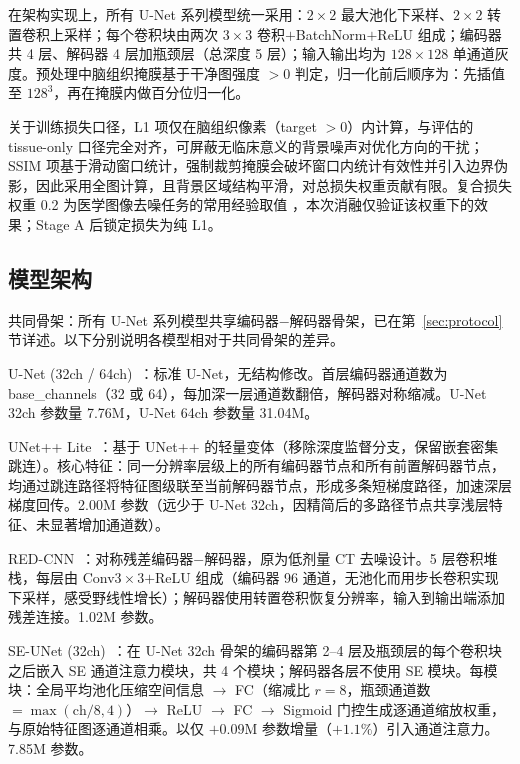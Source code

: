 \documentclass[UTF8,a4paper,12pt]{ctexart}
\begin{document}
在架构实现上，所有 U-Net 系列模型统一采用：$2\times2$ 最大池化下采样、$2\times2$ 转置卷积上采样；每个卷积块由两次 $3\times3$ 卷积$+$BatchNorm$+$ReLU 组成；编码器共 4 层、解码器 4 层加瓶颈层（总深度 5 层）；输入输出均为 $128\times128$ 单通道灰度。预处理中脑组织掩膜基于干净图强度 $>0$ 判定，归一化前后顺序为：先插值至 $128^3$，再在掩膜内做百分位归一化。

关于训练损失口径，L1 项仅在脑组织像素（target $> 0$）内计算，与评估的 tissue-only 口径完全对齐，可屏蔽无临床意义的背景噪声对优化方向的干扰；SSIM 项基于滑动窗口统计，强制裁剪掩膜会破坏窗口内统计有效性并引入边界伪影，因此采用全图计算，且背景区域结构平滑，对总损失权重贡献有限。复合损失权重 0.2 为医学图像去噪任务的常用经验取值 \cite{Ronneberger2015UNet,Zhang2017DnCNN}，本次消融仅验证该权重下的效果；Stage A 后锁定损失为纯 L1。

\subsection{模型架构}
\label{sec:architectures}

共同骨架：所有 U-Net 系列模型共享编码器$-$解码器骨架，已在第~\ref{sec:protocol} 节详述。以下分别说明各模型相对于共同骨架的差异。

U-Net (32ch / 64ch)~\cite{Ronneberger2015UNet}：标准 U-Net，无结构修改。首层编码器通道数为 base\_channels（32 或 64），每加深一层通道数翻倍，解码器对称缩减。U-Net 32ch 参数量 7.76M，U-Net 64ch 参数量 31.04M。

UNet++ Lite~\cite{Zhou2018UNetPP}：基于 UNet++ 的轻量变体（移除深度监督分支，保留嵌套密集跳连）。核心特征：同一分辨率层级上的所有编码器节点和所有前置解码器节点，均通过跳连路径将特征图级联至当前解码器节点，形成多条短梯度路径，加速深层梯度回传。2.00M 参数（远少于 U-Net 32ch，因精简后的多路径节点共享浅层特征、未显著增加通道数）。

RED-CNN~\cite{Chen2017REDCNN}：对称残差编码器$-$解码器，原为低剂量 CT 去噪设计。5 层卷积堆栈，每层由 Conv$3\times3$$+$ReLU 组成（编码器 96 通道，无池化而用步长卷积实现下采样，感受野线性增长）；解码器使用转置卷积恢复分辨率，输入到输出端添加残差连接。1.02M 参数。

SE-UNet (32ch)~\cite{Hu2018SENet}：在 U-Net 32ch 骨架的编码器第 2--4 层及瓶颈层的每个卷积块之后嵌入 SE 通道注意力模块，共 4 个模块；解码器各层不使用 SE 模块。每模块：全局平均池化压缩空间信息 $\to$ FC（缩减比 $r{=}8$，瓶颈通道数 $=\max(\text{ch}/8, 4)$）$\to$ ReLU $\to$ FC $\to$ Sigmoid 门控生成逐通道缩放权重，与原始特征图逐通道相乘。以仅 $+0.09$M 参数增量（$+1.1\%$）引入通道注意力。7.85M 参数。
\end{document}
